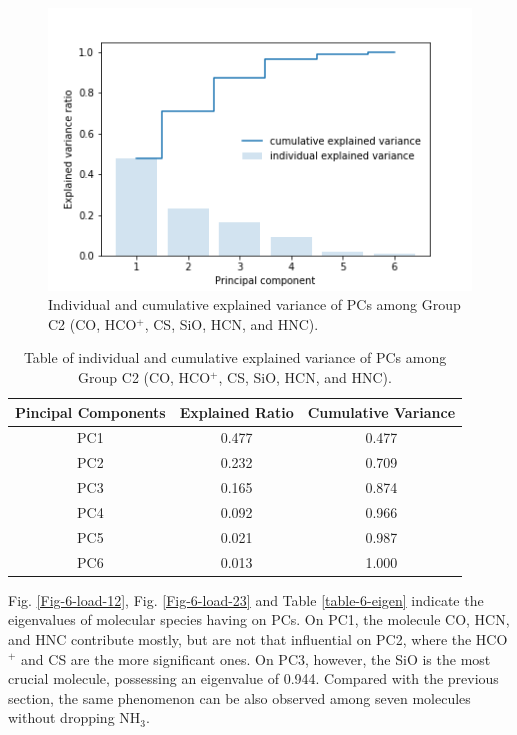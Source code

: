 \documentclass{aa}
\begin{document}
\begin{CJK*}{UTF8}{gbsn}
  
  \begin{figure}[htbp]
   \centering
   \captionsetup{justification=centering}
   \includegraphics[angle=0,scale = 0.6]{6/explained_variance_ratio.png}
   \caption{Individual and cumulative explained variance of PCs among Group C2 (CO, HCO$^+$, CS, SiO, HCN, and HNC).}
         \label{Fig13}
   \end{figure}
   
   

\begin{table}[htbp]
\centering
\begin{tabular}{ccc}
\hline\hline
\multicolumn{1}{l}{Pincipal Components} & \multicolumn{1}{l}{Explained Ratio} & Cumulative Variance \\ \hline
        PC1 & 0.477  & 0.477\\ 
        PC2 & 0.232  & 0.709\\
        PC3 & 0.165  & 0.874\\
        PC4 & 0.092  & 0.966\\ 
        PC5 & 0.021  & 0.987\\
        PC6 & 0.013  & 1.000\\ \hline\hline
\end{tabular}
\caption{Table of individual and cumulative explained variance of PCs among Group C2 (CO, HCO$^+$, CS, SiO, HCN, and HNC).}
\label{table-6-variance}
\end{table}

  Fig. \ref{Fig-6-load-12}, Fig. \ref{Fig-6-load-23} and Table \ref{table-6-eigen} indicate the eigenvalues of molecular species having on PCs. On PC1, the molecule CO, HCN, and HNC contribute mostly, but are not that influential on PC2, where the HCO$^+$ and CS are the more significant ones. 
  On PC3, however, the SiO is the most crucial molecule, possessing an eigenvalue of 0.944. 
  Compared with the previous section, the same phenomenon can be also observed among seven molecules without dropping NH$_3$. 
  

\end{CJK*}
\end{document}
